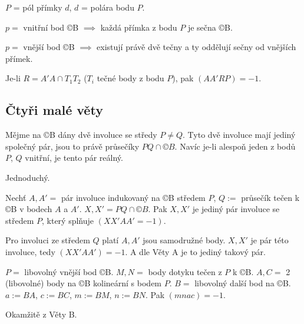 \documentclass[12pt]{article}					%
\begin{document}
\begin{definice}
	$P$ = pól přímky $d$, $d$ = polára bodu $P$.
\end{definice}

\begin{poznamka}
	$p =$ vnitřní bod ©B $\implies$ každá přímka z bodu $P$ je sečna ©B.

	$p =$ vnější bod ©B $\implies$ existují právě dvě tečny a ty oddělují sečny od vnějších přímek.
\end{poznamka}

\begin{dusledek}
	Je-li $R = A'A \cap T_1T_2$ ($T_i$ tečné body z bodu $P$), pak $(AA'RP) = -1$.
\end{dusledek}

\subsection{Čtyři malé věty}
\begin{veta}[A]
	Mějme na ©B dány dvě involuce se středy $P ≠ Q$. Tyto dvě involuce mají jediný společný pár, jsou to právě průsečíky $PQ \cap ©B$. Navíc je-li alespoň jeden z bodů $P$, $Q$ vnitřní, je tento pár reálný.

	\begin{dukazin}
		Jednoduchý.
	\end{dukazin}
\end{veta}

\begin{veta}[B]
	Nechť $A, A' =$ pár involuce indukovaný na ©B středem $P$, $Q :=$ průsečík tečen k ©B v bodech $A$ a $A'$. $X, X' = PQ \cap ©B$. Pak $X, X'$ je jediný pár involuce se středem $P$, který splňuje $(XX'AA' = -1)$.

	\begin{dukazin}
		Pro involuci ze středem $Q$ platí $A, A'$ jsou samodružné body. $X, X'$ je pár této involuce, tedy $(XX'AA') = -1$. A dle Věty A je to jediný takový pár.
	\end{dukazin}
\end{veta}

\begin{veta}[C]
	$P =$ libovolný vnější bod ©B. $M, N =$ body dotyku tečen z $P$ k ©B. $A, C = $ 2 (libovolné) body na ©B kolineární s bodem $P$. $B =$ libovolný další bod na ©B. $a:=BA$, $c:=BC$, $m:=BM$, $n:=BN$. Pak $(mnac) = -1$.

	\begin{dukazin}
		Okamžitě z Věty B.
	\end{dukazin}
\end{veta}
\end{document}
